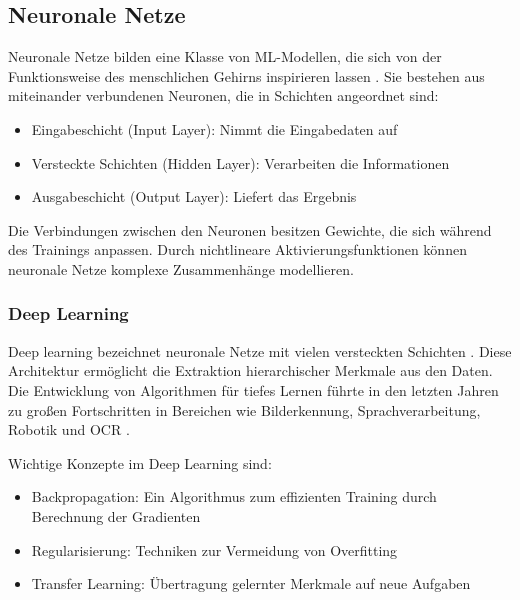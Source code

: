 \subsection{Neuronale Netze}
\label{subsec:neuronale-netze}

Neuronale Netze bilden eine Klasse von \gls{ML}-Modellen, die sich von der Funktionsweise des menschlichen Gehirns inspirieren lassen \cite{RebalaGopinath2019AItM}. Sie bestehen aus miteinander verbundenen Neuronen, die in Schichten angeordnet sind:

\begin{itemize}
	\item Eingabeschicht (Input Layer): Nimmt die Eingabedaten auf
	\item Versteckte Schichten (Hidden Layer): Verarbeiten die Informationen
	\item Ausgabeschicht (Output Layer): Liefert das Ergebnis
\end{itemize}

Die Verbindungen zwischen den Neuronen besitzen Gewichte, die sich während des Trainings anpassen. Durch nichtlineare Aktivierungsfunktionen können neuronale Netze komplexe Zusammenhänge modellieren.

\subsubsection{Deep Learning}
\label{subsec:deep-learning}

Deep learning bezeichnet neuronale Netze mit vielen versteckten Schichten \cite{RebalaGopinath2019AItM}. Diese Architektur ermöglicht die Extraktion hierarchischer Merkmale aus den Daten. Die Entwicklung von Algorithmen für tiefes Lernen führte in den letzten Jahren zu großen Fortschritten in Bereichen wie Bilderkennung, Sprachverarbeitung, Robotik und \gls{OCR} \cite{jordan2015machine}.

Wichtige Konzepte im Deep Learning sind:

\begin{itemize}
	\item Backpropagation: Ein Algorithmus zum effizienten Training durch Berechnung der Gradienten \cite{RebalaGopinath2019AItM}
	\item Regularisierung: Techniken zur Vermeidung von Overfitting \cite{jordan2015machine}
	\item Transfer Learning: Übertragung gelernter Merkmale auf neue Aufgaben \cite{jordan2015machine}
\end{itemize}

